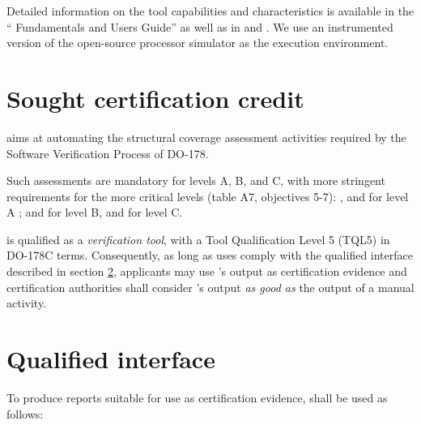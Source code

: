 \documentclass {report}
\begin{document}
Detailed information on the tool capabilities and characteristics is available
in the ``\xcov{} Fundamentals and Users Guide'' as well as in \adaeurope and
\erts.
%
We use an instrumented version of the \qemu{} open-source processor simulator
as the execution environment.

\section {Sought certification credit}

\xcov{} aims at automating the structural coverage assessment activities
required by the Software Verification Process of DO-178.

Such assessments are mandatory for levels A, B, and C, with more stringent
requirements for the more critical levels (table A7, objectives 5-7): \mcdc{},
\dc{} and \stc{} for level A ; \dc{} and \stc{} for level B, and \stc{} for
 level C.

\xcov{} is qualified as a \emph{verification tool}, with a Tool Qualification
Level 5 (TQL5) in DO-178C terms.
%
Consequently, as long as uses comply with the qualified interface described in
section \ref{sec:qual-interface}, applicants may use \xcov{}'s output as
certification evidence and certification authorities shall consider \xcov{}'s
output \emph{as good as} the output of a manual activity.

\section{Qualified interface}
\label{sec:qual-interface}

To produce reports suitable for use as certification evidence, \xcov{} shall
be used as follows:
\end{document}
